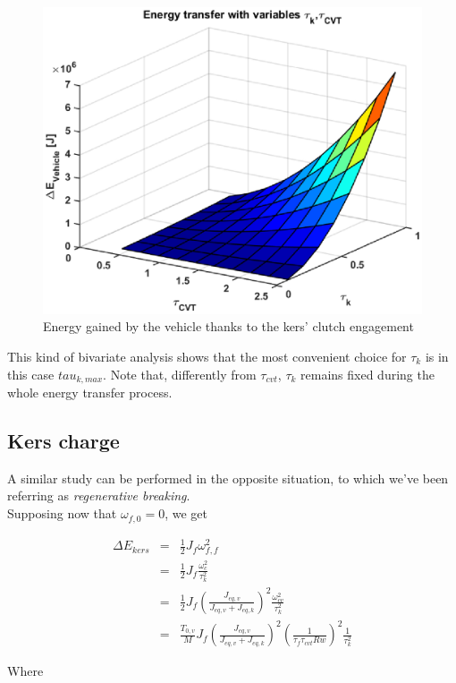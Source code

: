\documentclass[11pt]{article}
\begin{document}
\begin{figure}[H]
\captionsetup{font=small, justification=centering}
\centering
\includegraphics[width=.7\textwidth]{Images/Results_new/Univariate_SteadyState/en_comp_acc_3D.eps}
\caption{Energy gained by the vehicle thanks to the kers' clutch engagement}
\label{en_comp_acc_3D}
\end{figure}    

This kind of bivariate analysis shows that the most convenient choice for $\tau_k$ is in this case $tau_{k,max}$. Note that, differently from $\tau_{cvt}$, $\tau_k$ remains fixed during the whole energy transfer process.

\subsection{Kers charge}

A similar study can be performed in the opposite situation, to which we've been referring as \textit{regenerative breaking}.\\Supposing now that $\omega_{f,0}=0$, we get

\begin{eqnarray}
\Delta E_{kers}&=&\frac{1}{2}J_f\omega_{f,f}^2\\
               &=&\frac{1}{2}J_f\frac{\omega_{c}^2}{\tau_k^2}\\
               &=&\frac{1}{2}J_f\left(\frac{J_{eq,v}}{J_{eq,v}+J_{eq,k}}					          \right)^2\frac{\omega_{cv}^2}{\tau_k^2}\\               
               &=&\frac{T_{0,v}}{M}J_f\left(\frac{J_{eq,v}}{J_{eq,v}+J_{eq,k}}					     \right)^2\left(\frac{1}{\tau_f \tau_{cvt}Rw}\right)^2\frac{1}    						 {\tau_k^2} 
\end{eqnarray}

Where
\end{document}

